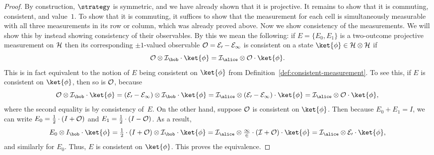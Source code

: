 \begin{proof}
  By construction, $\strategy$ is symmetric, and we have already shown that it
  is projective.
  It remains to show that it is commuting, consistent, and value~$1$.
  To show that it is commuting, it suffices to show that the measurement for
  each cell is simultaneously measurable with all three measurements in its row
  or column, which was already proved above.
  Now we show consistency of the measurements.
  We will show this by instead showing consistency of their observables.
  By this we mean the following: if $E = \{E_0, E_1\}$ is a two-outcome projective measurement on $\cal{H}$
  then its corresponding $\pm 1$-valued observable $\cal{O} = E_0 - E_1$
  is consistent on a state $\ket{\phi} \in \cal{H} \otimes \cal{H}$ if
  \begin{equation*}
  \cal{O}\otimes I_{\bob} \cdot \ket{\phi} = I_{\alice} \otimes \cal{O} \cdot \ket{\phi}.
  \end{equation*}
  This is in fact equivalent to the notion of $E$ being consistent on $\ket{\phi}$ from Definition~\ref{def:consistent-measurement}.
  To see this, if $E$ is consistent on $\ket{\phi}$, then so is $\cal{O}$, because
  \begin{equation*}
  \cal{O}\otimes I_{\bob} \cdot \ket{\phi}
  = (E_0 - E_1) \otimes I_{\bob} \cdot \ket{\phi}
  = I_{\alice} \otimes (E_0 - E_1) \cdot \ket{\phi}
  = I_{\alice} \otimes \cal{O} \cdot \ket{\phi},
  \end{equation*}
  where the second equality is by consistency of~$E$.
  On the other hand, suppose $\cal{O}$ is consistent on $\ket{\phi}$.
  Then because $E_0 + E_1 = I$, we can write $E_0 = \tfrac{1}{2} \cdot (I + \cal{O})$ and $E_1 = \tfrac{1}{2} \cdot (I - \cal{O})$.
  As a result,
  \begin{equation*}
  E_0 \otimes I_{\bob} \cdot \ket{\phi}
  = \tfrac{1}{2} \cdot (I + \cal{O}) \otimes I_{\bob} \cdot \ket{\phi}
  = I_{\alice} \otimes \tfrac{1}{2} \cdot (I + \cal{O}) \cdot \ket{\phi}
  = I_{\alice} \otimes E_0 \cdot \ket{\phi},
  \end{equation*}
  and similarly for $E_0$. Thus, $E$ is consistent on $\ket{\phi}$.
  This proves the equivalence.
  

\end{proof}
